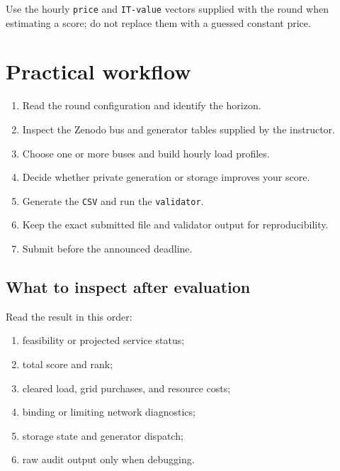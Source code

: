 \documentclass[12pt]{article}
\newcommand{\code}[1]{\texttt{#1}}
\begin{document}
Use the hourly \code{price} and \code{IT-value} vectors supplied with the round when
estimating a score; do not replace them with a guessed constant price.

\section{Practical workflow}
\begin{enumerate}[leftmargin=*]
  \item Read the round configuration and identify the horizon.
  \item Inspect the Zenodo bus and generator tables supplied by the instructor.
  \item Choose one or more buses and build hourly load profiles.
  \item Decide whether private generation or storage improves your score.
  \item Generate the \code{CSV} and run the \code{validator}.
  \item Keep the exact submitted file and validator output for reproducibility.
  \item Submit before the announced deadline.
\end{enumerate}

\subsection{What to inspect after evaluation}
Read the result in this order:
\begin{enumerate}[leftmargin=*]
  \item feasibility or projected service status;
  \item total score and rank;
  \item cleared load, grid purchases, and resource costs;
  \item binding or limiting network diagnostics;
  \item storage state and generator dispatch;
  \item raw audit output only when debugging.
\end{enumerate}
\end{document}
